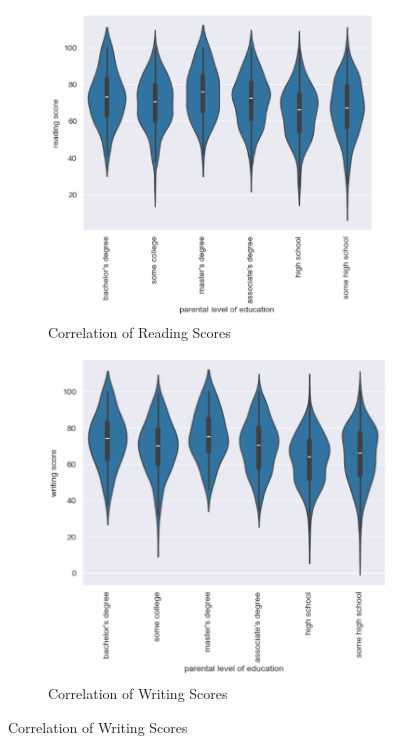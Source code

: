 \documentclass[fleqn,10pt]{olplainarticle}
\begin{document}
\begin{figure}[h!]
\begin{subfigure}{0.3\textwidth}
    \includegraphics[width=\linewidth]{ReadingVsParent.png}
    \caption{Correlation of Reading Scores}
    \label{fig:view}
    \end{subfigure}
    \begin{subfigure}{0.3\textwidth}
    \includegraphics[width=\linewidth]{WritingVsParent.png}
    \caption{Correlation of Writing Scores}
    \label{fig:view}
    \end{subfigure}
\end{figure}
\end{document}
